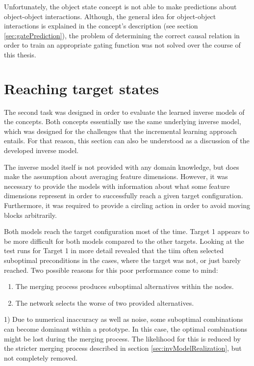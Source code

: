 Unfortunately, the object state concept is not able to make predictions about object-object interactions. Although, the general idea for object-object interactions is explained in the concept's description (see section \ref{sec:gatePrediction}), the problem of determining the correct causal relation in order to train an appropriate gating function was not solved over the course of this thesis.

\section{Reaching target states}

The second task was designed in order to evaluate the learned inverse models of the concepts. Both concepts essentially use the same underlying inverse model, which was designed for the challenges that the incremental learning approach entails. 
For that reason, this section can also be understood as a discussion of the developed inverse model.

The inverse model itself is not provided with any domain knowledge, but does make the assumption about averaging feature dimensions. 
However, it was necessary to provide the models with information about what some feature dimensions represent in order to successfully reach a given target configuration. 
Furthermore, it was required to provide a circling action in order to avoid moving blocks arbitrarily.

Both models reach the target configuration most of the time. Target 1 appears to be more difficult for both models compared to the other targets. 
Looking at the test runs for Target 1 in more detail revealed that the \gls{tiim} often selected suboptimal preconditions in the cases, where the target was not, or just barely reached.
Two possible reasons for this poor performance come to mind:
\begin{enumerate}
\item The merging process produces suboptimal alternatives within the nodes.
\item The network selects the worse of two provided alternatives.
\end{enumerate}

1) Due to numerical inaccuracy as well as noise, some suboptimal combinations can become dominant within a prototype. In this case, the optimal combinations might be lost during the merging process. The likelihood for this is reduced by the stricter merging process described in section \ref{sec:invModelRealization}, but not completely removed.

